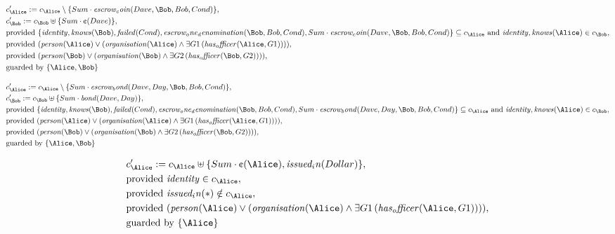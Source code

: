 \begin{align*}
&
c'_
{
\Alice
}
 := 
c_
{
\Alice
}
 \setminus 
\{
Sum
\cdot
\mathit{
escrow_coin
}
(
Dave
,
\Bob
,
Bob
,
Cond
)
\}
,\\
&
c'_
{
\Bob
}
 := 
c_
{
\Bob
}
 \uplus 
\{
Sum
\cdot
\text{\textcent}
(
Dave
)
\}
,\\
&
\text{provided } 
\{
\mathit{
identity
}
,
\mathit{
knows
}
(
\Bob
)
,
\mathit{
failed
}
(
Cond
)
,
\mathit{
escrow_one_denomination
}
(
\Bob
,
Bob
,
Cond
)
,
Sum
\cdot
\mathit{
escrow_coin
}
(
Dave
,
\Bob
,
Bob
,
Cond
)
\}
 \subseteq c_
{
\Alice
}
 \text{ and } 
\mathit{
identity
}
,
\mathit{
knows
}
(
\Alice
)
 \in c_
{
\Bob
}
,\\
&
\text{provided } 
(
\mathit{
person
}
(
\Alice
)
\lor
(
\mathit{
organisation
}
(
\Alice
)
\land
\exists 
G1
\,(
\mathit{
has_officer
}
(
\Alice
,
G1
)
)
)
)
,\\
&
\text{provided } 
(
\mathit{
person
}
(
\Bob
)
\lor
(
\mathit{
organisation
}
(
\Bob
)
\land
\exists 
G2
\,(
\mathit{
has_officer
}
(
\Bob
,
G2
)
)
)
)
,\\
&
\text{guarded by } \{
\Alice
,
\Bob
\}
\end{align*}

\begin{align*}
&
c'_
{
\Alice
}
 := 
c_
{
\Alice
}
 \setminus 
\{
Sum
\cdot
\mathit{
escrow_bond
}
(
Dave
,
Day
,
\Bob
,
Bob
,
Cond
)
\}
,\\
&
c'_
{
\Bob
}
 := 
c_
{
\Bob
}
 \uplus 
\{
Sum
\cdot
\mathit{
bond
}
(
Dave
,
Day
)
\}
,\\
&
\text{provided } 
\{
\mathit{
identity
}
,
\mathit{
knows
}
(
\Bob
)
,
\mathit{
failed
}
(
Cond
)
,
\mathit{
escrow_one_denomination
}
(
\Bob
,
Bob
,
Cond
)
,
Sum
\cdot
\mathit{
escrow_bond
}
(
Dave
,
Day
,
\Bob
,
Bob
,
Cond
)
\}
 \subseteq c_
{
\Alice
}
 \text{ and } 
\mathit{
identity
}
,
\mathit{
knows
}
(
\Alice
)
 \in c_
{
\Bob
}
,\\
&
\text{provided } 
(
\mathit{
person
}
(
\Alice
)
\lor
(
\mathit{
organisation
}
(
\Alice
)
\land
\exists 
G1
\,(
\mathit{
has_officer
}
(
\Alice
,
G1
)
)
)
)
,\\
&
\text{provided } 
(
\mathit{
person
}
(
\Bob
)
\lor
(
\mathit{
organisation
}
(
\Bob
)
\land
\exists 
G2
\,(
\mathit{
has_officer
}
(
\Bob
,
G2
)
)
)
)
,\\
&
\text{guarded by } \{
\Alice
,
\Bob
\}
\end{align*}

\begin{align*}
&
c'_
{
\Alice
}
 := 
c_
{
\Alice
}
 \uplus 
\{
Sum
\cdot
\text{\textcent}
(
\Alice
)
,
\mathit{
issued_in
}
(
Dollar
)
\}
,\\
&
\text{provided } 
\mathit{
identity
}
 \in c_
{
\Alice
}
,\\
&
\text{provided } 
\mathit{
issued_in
}
(
\ast
)
 \notin c_
{
\Alice
}
,\\
&
\text{provided } 
(
\mathit{
person
}
(
\Alice
)
\lor
(
\mathit{
organisation
}
(
\Alice
)
\land
\exists 
G1
\,(
\mathit{
has_officer
}
(
\Alice
,
G1
)
)
)
)
,\\
&
\text{guarded by } \{
\Alice
\}
\end{align*}
